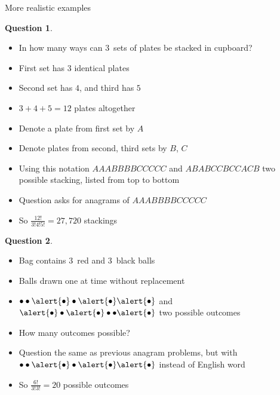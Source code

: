 \documentclass[handout]{beamer}
\theoremstyle{definition}
\newtheorem{question}{Question}
\begin{document}
\begin{frame}{More realistic examples}
\begin{question}
\begin{itemize}
\item In how many ways can $3$~sets of plates be stacked in cupboard?
\item First set has $3$ identical plates
\item Second set has $4$, and third has $5$
\end{itemize}
\end{question}
\begin{itemize}
\item $3+4+5=12$ plates altogether
\item Denote a plate from first set by $A$
\item Denote plates from second, third sets by $B$, $C$
\item Using this notation
$AAABBBBCCCCC$ and $ABABCCBCCACB$ two possible stacking,
listed from top to bottom
\item Question asks for anagrams of $AAABBBBCCCCC$
\item So $\frac{12!}{3!4!5!}=27,720$ stackings
\end{itemize}
\end{frame}

\begin{frame}
\begin{question}
\begin{itemize}
\item Bag contains $3$~red and $3$~black balls
\item Balls drawn one at time without replacement
\item $\bullet\bullet\alert{\bullet}\bullet\alert{\bullet}\alert{\bullet}$
and $\alert{\bullet}\bullet\alert{\bullet}\bullet\bullet\alert{\bullet}$
two possible outcomes
\item How many outcomes possible?
\end{itemize}
\end{question}
\begin{itemize}
\item Question the same as previous anagram problems,
but with 
$\bullet\bullet\alert{\bullet}\bullet\alert{\bullet}\alert{\bullet}$
instead of English word
\item So $\frac{6!}{3!3!}=20$ possible outcomes
\end{itemize}
\end{frame}
\end{document}
